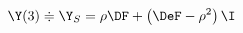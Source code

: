 \begin{equation}
  \label{eq:Y3}
  \Y(3) \doteqdot \Y_S = \rho\DF + \left(\DeF-\rho^2 \right)\I
\end{equation}

